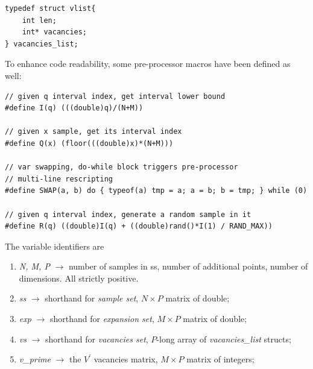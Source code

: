 \documentclass[12pt]{extarticle}
\begin{document}
\begin{lstlisting}[style=CStyle]
typedef struct vlist{
    int len;
    int* vacancies;
} vacancies_list;
\end{lstlisting}

To enhance code readability, some pre-processor macros have been defined as well:

\begin{lstlisting}[style=CStyle]
// given q interval index, get interval lower bound
#define I(q) (((double)q)/(N+M))     

// given x sample, get its interval index
#define Q(x) (floor(((double)x)*(N+M)))     

// var swapping, do-while block triggers pre-processor 
// multi-line rescripting
#define SWAP(a, b) do { typeof(a) tmp = a; a = b; b = tmp; } while (0)  

// given q interval index, generate a random sample in it 
#define R(q) ((double)I(q) + ((double)rand()*I(1) / RAND_MAX))

\end{lstlisting}

The variable identifiers are
\begin{enumerate}
\item[] \emph{N, M, P} $\rightarrow$ number of samples in ss, number of additional points, number of dimensions. All strictly positive.

\item[] \emph{ss} $\rightarrow$ shorthand for \textit{sample set}, $N \times P$ matrix of double;

\item[] \emph{exp} $\rightarrow$ shorthand for \textit{expansion set}, $M \times P$ matrix of double;

\item[] \emph{vs} $\rightarrow$ shorthand for \textit{vacancies set}, $P$-long array of \textit{vacancies{\_}list} structs;

\item[] \emph{v{\_}prime} $\rightarrow$ the $V^\prime$ vacancies matrix, $M \times P$ matrix of integers;
\end{enumerate}
\end{document}

